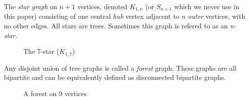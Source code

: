 \begin{definition}
The \textit{star graph} on $n+1$ vertices, denoted $K_{1,n}$ (or $S_{n+1}$ which we never use in this paper) consisting of one central \textit{hub} vertex adjacent to $n$ \textit{outer} vertices, with no other edges. All stars are trees. Sometimes this graph is refered to as an \textit{n-star}.
\end{definition}

\begin{figure}[H]
    \begin{center}
    \end{center}
    \caption{The $7$-star (\(K_{1,7}\))}
    \label{fig:star-7}
    \end{figure}
    

\begin{definition}

Any disjoint union of tree graphs is called a \textit{forest} graph. These graphs are all bipartite and can be equivalently defined as disconnected bipartite graphs.
\end{definition}

\begin{figure}[H]
    \begin{center}
    \end{center}
    \caption{A forest on 9 vertices}
    \label{fig:star-and-path}
    \end{figure}
    

